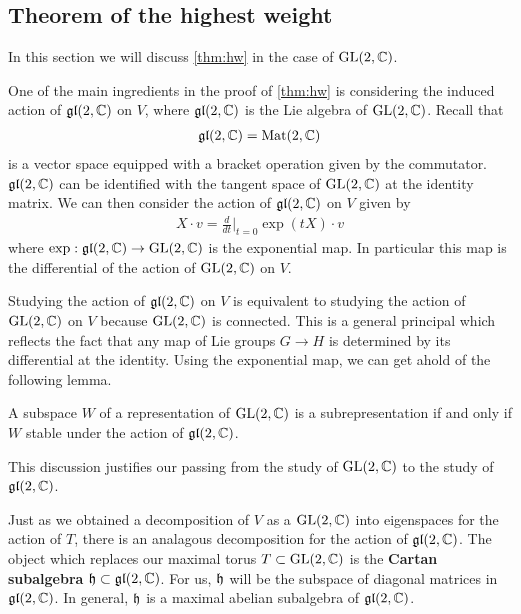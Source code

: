 \documentclass[12pt]{article}
\begin{document}
\subsection{Theorem of the highest weight}
In this section we will discuss \ref{thm:hw} in the case of $\operatorname{GL}(2,\mathbb{C})$.

\hfill

One of the main ingredients in the proof of \ref{thm:hw} is considering the induced action of $\operatorname{\mathfrak{gl}}(2,\mathbb{C})$ on $V$,
where $\operatorname{\mathfrak{gl}}(2,\mathbb{C})$ is the Lie algebra of $\operatorname{GL}(2,\mathbb{C})$. Recall that \begin{align*}
    \operatorname{\mathfrak{gl}}(2,\mathbb{C}) = \operatorname{Mat}(2,\mathbb{C})
\end{align*} is a vector space equipped with a bracket operation given by the commutator. $\operatorname{\mathfrak{gl}}(2,\mathbb{C})$
can be identified with the tangent space of $\operatorname{GL}(2,\mathbb{C})$ at the identity matrix. We can then consider the action of $\operatorname{\mathfrak{gl}}(2,\mathbb{C})$ on $V$ given by \begin{align*}
    X\cdot v = \frac{d}{dt}\bigg\vert_{t=0} \exp(tX)\cdot v
\end{align*} where $\exp: \operatorname{\mathfrak{gl}}(2,\mathbb{C})\to \operatorname{GL}(2,\mathbb{C})$ is the exponential map. In particular this map is the differential of the action of $\operatorname{GL}(2,\mathbb{C})$ on $V$.

\hfill

Studying the action of $\operatorname{\mathfrak{gl}}(2,\mathbb{C})$ on $V$ is equivalent to studying the action of $\operatorname{GL}(2,\mathbb{C})$ on $V$ because $\operatorname{GL}(2,\mathbb{C})$ is connected.
This is a general principal which reflects the fact that any map of Lie groups $G\to H$ is determined by its differential at the identity.
Using the exponential map, we can get ahold of the following lemma.
\begin{lemma}
    A subspace $W$ of a representation of $\operatorname{GL}(2,\mathbb{C})$ is a subrepresentation if and only if $W$ stable under the action of $\operatorname{\mathfrak{gl}}(2,\mathbb{C})$.
\end{lemma}
This discussion justifies our passing from the study of $\operatorname{GL}(2,\mathbb{C})$ to the study of $\operatorname{\mathfrak{gl}}(2,\mathbb{C})$.

\hfill

Just as we obtained a decomposition of $V$ as a $\operatorname{GL}(2,\mathbb{C})$ into eigenspaces for the action of $T$,
there is an analagous decomposition for the action of $\operatorname{\mathfrak{gl}}(2,\mathbb{C})$. 
The object which replaces our maximal torus $T\subset\operatorname{GL}(2,\mathbb{C})$ is the \textbf{Cartan subalgebra} $\mathfrak{h}\subset \operatorname{\mathfrak{gl}}(2,\mathbb{C})$.
For us, $\mathfrak{h}$ will be the subspace of diagonal matrices in $\operatorname{\mathfrak{gl}}(2,\mathbb{C})$. In general, $\mathfrak{h}$ is a maximal abelian subalgebra of $\operatorname{\mathfrak{gl}}(2,\mathbb{C})$.
\end{document}
